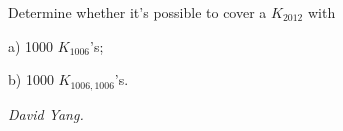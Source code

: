 Determine whether it's possible to cover a $K_{2012}$ with

a) 1000 $K_{1006}$'s;

b) 1000 $K_{1006,1006}$'s.

\textit{David Yang.}